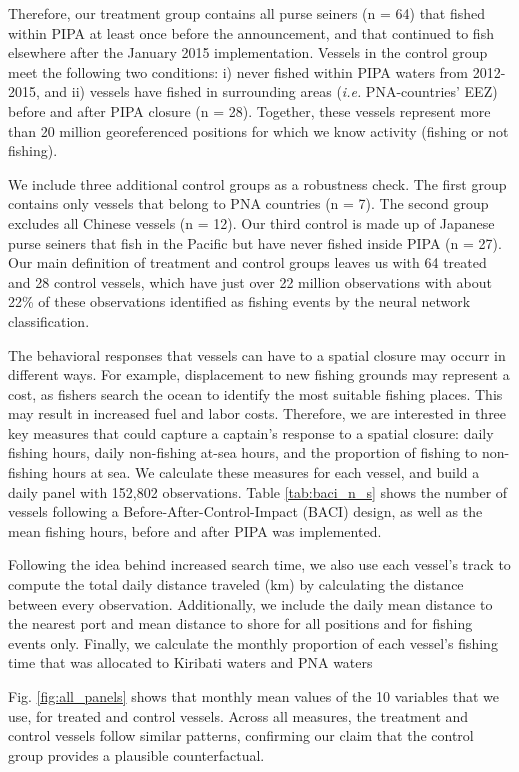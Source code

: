 \documentclass[9pttwoside,lineno]{pnas-new}
\begin{document}
Therefore, our treatment group contains all purse seiners (n = 64) that
fished within PIPA at least once before the announcement, and that
continued to fish elsewhere after the January 2015 implementation.
Vessels in the control group meet the following two conditions: i)
never fished within PIPA waters from 2012-2015, and ii) vessels have fished in
surrounding areas (\emph{i.e.} PNA-countries' EEZ) before and after PIPA
closure (n = 28). Together, these vessels represent more than 20 million georeferenced positions
for which we know activity (fishing or not fishing).

We include three additional control groups as a
robustness check. The first group contains only vessels that belong to PNA countries (n
= 7). The second group excludes all Chinese vessels (n = 12). Our third control
is made up of Japanese purse seiners that fish in the Pacific but have
never fished inside PIPA (n = 27). Our main definition of treatment and control
groups leaves us with 64 treated and 28 control vessels, which have just over 22 million
observations with about 22\% of these observations identified as fishing events by the neural network classification.

The behavioral responses that vessels can have to a spatial closure may occurr in different ways.
For example, displacement to new fishing grounds may represent a cost, as fishers search the ocean
to identify the most suitable fishing places. This may result in increased fuel and labor costs. Therefore,
we are interested in three key measures that could capture a captain's response to a spatial closure:
daily fishing hours, daily non-fishing at-sea hours, and the proportion of fishing to non-fishing hours at sea.
We calculate these measures for each vessel, and build a daily panel
with 152,802 observations. Table \ref{tab:baci_n_s} shows the number
of vessels following a Before-After-Control-Impact (BACI) design, as well as the mean fishing hours, before
and after PIPA was implemented.

Following the idea behind increased search time, we also use each vessel's track to compute
the total daily distance traveled (km) by calculating the distance between every observation.
Additionally, we include the daily mean distance to the nearest port and mean distance to shore
for all positions and for fishing events only. Finally, we calculate the monthly proportion of each vessel's
fishing time that was allocated to Kiribati waters and PNA waters

Fig. \ref{fig:all_panels} shows that monthly mean values of the 10 variables that we use,
for treated and control vessels.  Across all measures, the treatment and control vessels follow similar patterns,
confirming our claim that the control group provides a plausible
counterfactual.
\end{document}
